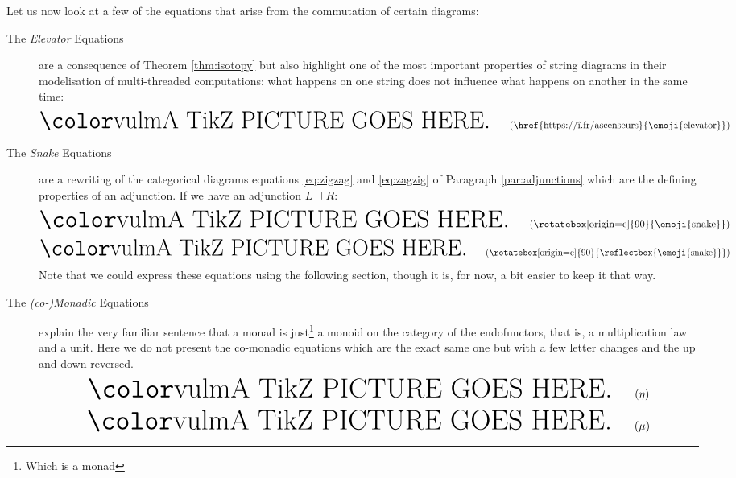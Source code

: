 \documentclass[math, english, info]{cours}
\begin{document}
Let us now look at a few of the equations that arise from the commutation of certain diagrams:
\begin{description}
	\item[The \emph{Elevator} Equations] are a consequence of Theorem \ref{thm:isotopy} but also highlight one of the most important properties of string diagrams in their modelisation of multi-threaded computations: what happens on one string does not influence what happens on another in the same time:
	      \begin{equation}
		      \inputtikz{sd-elevator}
		      \label{eq:elevator}
		      \tag{\href{https://î.fr/ascenseurs}{\emoji{elevator}}}
	      \end{equation}

	\item[The \emph{Snake} Equations] are a rewriting of the categorical diagrams equations \eqref{eq:zigzag} and \eqref{eq:zagzig} of Paragraph \ref{par:adjunctions} which are the defining properties of an adjunction.
	      If we have an adjunction $L\dashv R$:
	      \begin{equation}
		      \inputtikz{sd-snake1}
		      \tag{\rotatebox[origin=c]{90}{\emoji{snake}}}
		      \label{eq:snek1}
	      \end{equation}
	      \vspace{-12pt}
	      \begin{equation}
		      \inputtikz{sd-snake2}
		      \tag{\rotatebox[origin=c]{90}{\reflectbox{\emoji{snake}}}}
		      \label{eq:snek2}
	      \end{equation}
	      Note that we could express these equations using the following section, though it is, for now, a bit easier to keep it that way.
	\item[The \emph{(co-)Monadic} Equations] explain the very familiar sentence that a monad is just\footnote{Which is a monad} a monoid on the category of the endofunctors, that is, a multiplication law and a unit.
	      Here we do not present the co-monadic equations which are the exact same one but with a few letter changes and the up and down reversed.
	      \begin{equation}
		      \inputtikz{sd-monad-unit}
		      \label{eq:unitax}
		      \tag{$\eta$}
	      \end{equation}
	      \begin{equation}
		      \inputtikz{sd-monad-mult}
		      \label{eq:muax}
		      \tag{$\mu$}
	      \end{equation}
\end{description}
\end{document}
